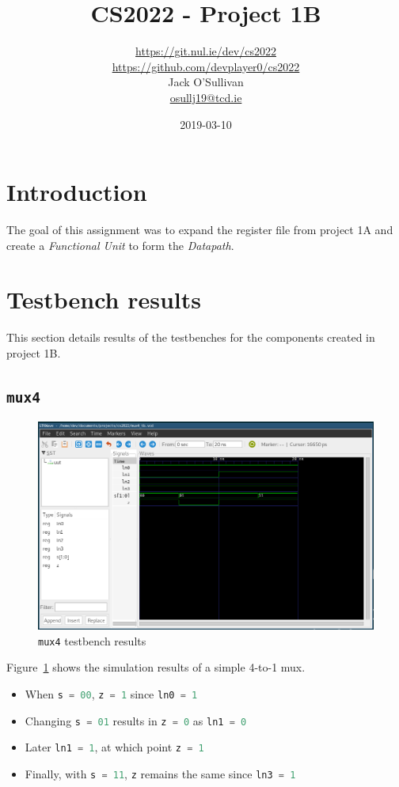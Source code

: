 \documentclass[a4paper]{article}
\title{CS2022 - Project 1B}
\date{2019-03-10}
\author{\url{https://git.nul.ie/dev/cs2022}\\\url{https://github.com/devplayer0/cs2022}\\Jack O'Sullivan\\\href{mailto:osullj19@tcd.ie}{osullj19@tcd.ie}}
\numberwithin{figure}{section}
\numberwithin{table}{section}
\newcommand{\mi}{\mintinline}
\begin{document}
\maketitle
\tableofcontents
{}

\newpage
{}
\section{Introduction}
The goal of this assignment was to expand the register file from project 1A and create a \emph{Functional Unit} to form the \emph{Datapath}.

\section{Testbench results}
This section details results of the testbenches for the components created in project 1B.

\subsection{\mi{c}{mux4}}
\begin{figure}[h!]
	\centering
	\includegraphics[width=\textwidth]{mux4_tb}
	\caption{\mi{c}{mux4} testbench results}
	\label{fig:mux4}
\end{figure}

Figure~\ref{fig:mux4} shows the simulation results of a simple 4-to-1 mux.
\begin{itemize}
	\item When \mi{c}{s = 00}, \mi{c}{z = 1} since \mi{c}{ln0 = 1}
	\item Changing \mi{c}{s = 01} results in \mi{c}{z = 0} as \mi{c}{ln1 = 0}
	\item Later \mi{c}{ln1 = 1}, at which point \mi{c}{z = 1}
	\item Finally, with \mi{c}{s = 11}, \mi{c}{z} remains the same since \mi{c}{ln3 = 1}
\end{itemize}
\end{document}
